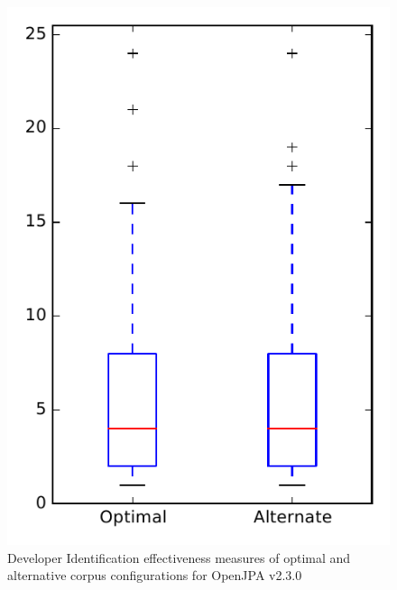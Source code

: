 
\begin{figure}
\centering
\includegraphics[height=0.4\textheight]{figures/combo/dit_rq2_openjpa}
\caption{Developer Identification effectiveness measures of optimal and alternative corpus configurations for OpenJPA v2.3.0}
\label{fig:combo:dit:rq2:openjpa}
\end{figure}
